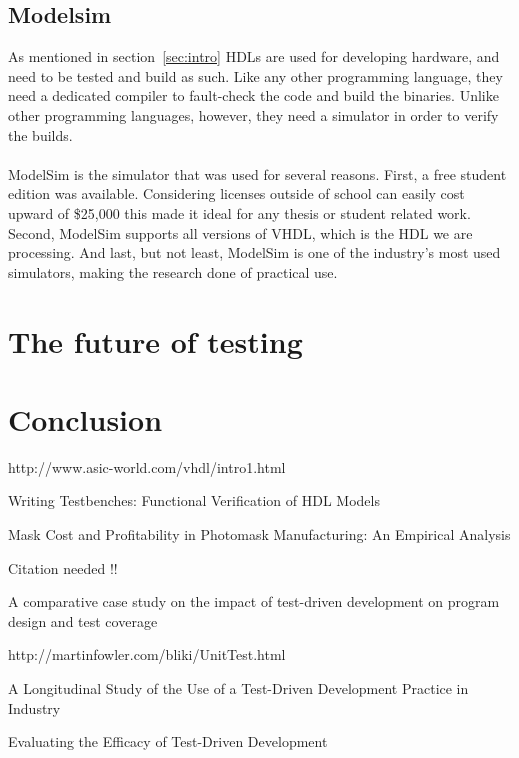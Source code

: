 \documentclass[11pt,british]{article}
\begin{document}
\subsection{Modelsim}
As mentioned in section~\ref{sec:intro} HDLs are used for developing hardware, and need to be tested and build as such. Like any other programming language, they need a dedicated compiler to fault-check the code and build the binaries. Unlike other programming languages, however, they need a simulator in order to verify the builds.
\\
\\
ModelSim is the simulator that was used for several reasons. First, a free student edition was available. Considering licenses  outside of school can easily cost upward of \$25,000 this made it ideal for any thesis or student related work. Second, ModelSim supports all versions of VHDL, which is the HDL we are processing. And last, but not least, ModelSim is one of the industry's most used simulators, making the research done of practical use.


\newpage{}
\section{The future of testing}

\newpage{}
\section{Conclusion}

\pagebreak{}
\begin{thebibliography}{1}
http://www.asic-world.com/vhdl/intro1.html

Writing Testbenches: Functional Verification of HDL
Models

Mask Cost and Profitability in Photomask Manufacturing:
An Empirical Analysis

Citation needed !!

A comparative case study on the impact of test-driven
development on program design and test coverage

http://martinfowler.com/bliki/UnitTest.html

A Longitudinal Study of the Use of a Test-Driven Development
Practice in Industry

Evaluating the Efficacy of Test-Driven Development

\end{thebibliography}
\end{document}
